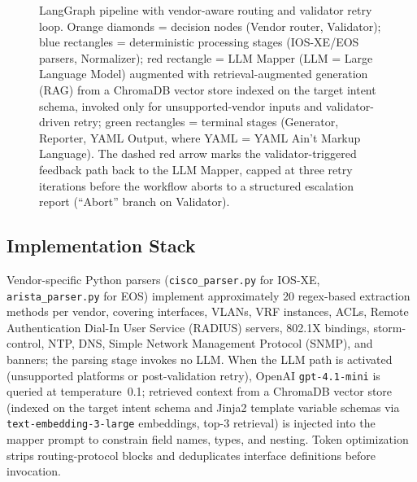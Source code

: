 \documentclass[conference]{IEEEtran}
\begin{document}
\begin{figure}[!t]
{%
}
\caption{LangGraph pipeline with vendor-aware routing and validator retry loop. Orange diamonds = decision nodes (Vendor router, Validator); blue rectangles = deterministic processing stages (IOS-XE/EOS parsers, Normalizer); red rectangle = LLM Mapper (LLM = Large Language Model) augmented with retrieval-augmented generation (RAG) from a ChromaDB vector store indexed on the target intent schema, invoked only for unsupported-vendor inputs and validator-driven retry; green rectangles = terminal stages (Generator, Reporter, YAML Output, where YAML = YAML Ain't Markup Language). The dashed red arrow marks the validator-triggered feedback path back to the LLM Mapper, capped at three retry iterations before the workflow aborts to a structured escalation report (``Abort'' branch on Validator).}
\label{fig:workflow}
\end{figure}

\subsection{Implementation Stack}

Vendor-specific Python parsers (\texttt{cisco\_parser.py} for IOS-XE, \texttt{arista\_parser.py} for EOS) implement approximately 20 regex-based extraction methods per vendor, covering interfaces, VLANs, VRF instances, ACLs, Remote Authentication Dial-In User Service (RADIUS) servers, 802.1X bindings, storm-control, NTP, DNS, Simple Network Management Protocol (SNMP), and banners; the parsing stage invokes no LLM. When the LLM path is activated (unsupported platforms or post-validation retry), OpenAI \texttt{gpt-4.1-mini} is queried at temperature~0.1; retrieved context from a ChromaDB vector store (indexed on the target intent schema and Jinja2 template variable schemas via \texttt{text-embedding-3-large} embeddings, top-3 retrieval) is injected into the mapper prompt to constrain field names, types, and nesting. Token optimization strips routing-protocol blocks and deduplicates interface definitions before invocation.
\end{document}
